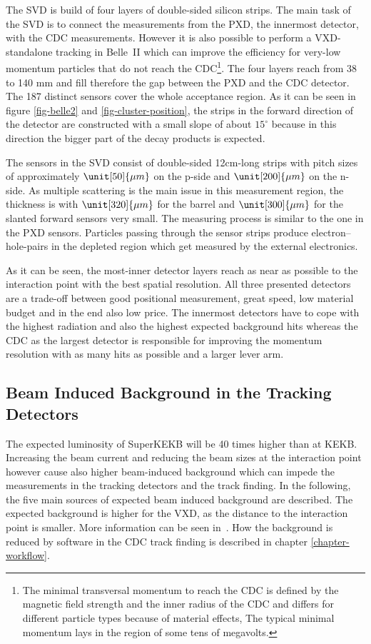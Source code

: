 The SVD is build of four layers of double-sided silicon strips. The main task of the SVD is to connect the measurements from the PXD, the innermost detector, with the CDC measurements. However it is also possible to perform a VXD-standalone tracking in Belle~II which can improve the efficiency for very-low momentum particles that do not reach the CDC\footnote{The minimal transversal momentum to reach the CDC is defined by the magnetic field strength and the inner radius of the CDC and differs for different particle types because of material effects, The typical minimal momentum lays in the region of some tens of megavolts.}. The four layers reach from 38 to 140 mm and fill therefore the gap between the PXD and the CDC detector. The 187 distinct sensors cover the whole acceptance region. As it can be seen in figure \ref{fig-belle2} and \ref{fig-cluster-position}, the strips in the forward direction of the detector are constructed with a small slope of about $15^\circ$ because in this direction the bigger part of the decay products is expected. 

The sensors in the SVD consist of double-sided 12cm-long strips with pitch sizes of approximately $\unit[50]{\mu m}$ on the p-side and $\unit[200]{\mu m}$ on the n-side. As multiple scattering is the main issue in this measurement region, the thickness is with $\unit[320]{\mu m}$ for the barrel and $\unit[300]{\mu m}$ for the slanted forward sensors very small. The measuring process is similar to the one in the PXD sensors. Particles passing through the sensor strips produce electron--hole-pairs in the depleted region which get measured by the external electronics. 

As it can be seen, the most-inner detector layers reach as near as possible to the interaction point with the best spatial resolution. All three presented detectors are a trade-off between good positional measurement, great speed, low material budget and in the end also low price. The innermost detectors have to cope with the highest radiation and also the highest expected background hits whereas the CDC as the largest detector is responsible for improving the momentum resolution with as many hits as possible and a larger lever arm.

\subsection{Beam Induced Background in the Tracking Detectors}

The expected luminosity of SuperKEKB will be 40 times higher than at KEKB. Increasing the beam current and reducing the beam sizes at the interaction point however cause also higher beam-induced background which can impede the measurements in the tracking detectors and the track finding. In the following, the five main sources of expected beam induced background are described. The expected background is higher for the VXD, as the distance to the interaction point is smaller. More information can be seen in~\cite{jakob}. How the background is reduced by software in the CDC track finding is described in chapter \ref{chapter-workflow}.

